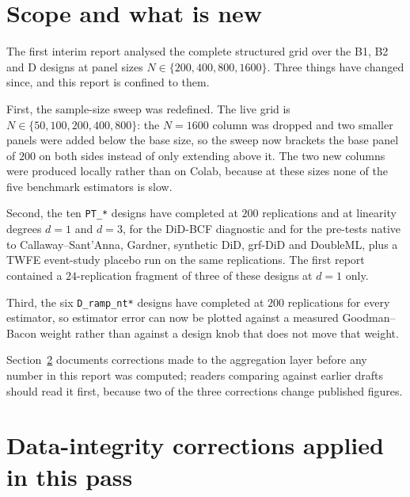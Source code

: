\documentclass[11pt]{article}
\begin{document}
\tableofcontents

\section{Scope and what is new}

The first interim report analysed the complete structured grid over the B1,
B2 and D designs at panel sizes $N\in\{200,400,800,1600\}$. Three things have
changed since, and this report is confined to them.

First, the sample-size sweep was redefined. The live grid is
$N\in\{50,100,200,400,800\}$: the $N=1600$ column was dropped and two smaller
panels were added below the base size, so the sweep now brackets the base
panel of $200$ on both sides instead of only extending above it. The two new
columns were produced locally rather than on Colab, because at these sizes
none of the five benchmark estimators is slow.

Second, the ten \texttt{PT\_*} designs have completed at $200$ replications
and at linearity degrees $d=1$ and $d=3$, for the DiD-BCF diagnostic and for
the pre-tests native to Callaway--Sant'Anna, Gardner, synthetic DiD, grf-DiD
and DoubleML, plus a TWFE event-study placebo run on the same replications.
The first report contained a $24$-replication fragment of three of these
designs at $d=1$ only.

Third, the six \texttt{D\_ramp\_nt*} designs have completed at $200$
replications for every estimator, so estimator error can now be plotted
against a measured Goodman--Bacon weight rather than against a design knob
that does not move that weight.

Section~\ref{sec:integrity} documents corrections made to the aggregation
layer before any number in this report was computed; readers comparing against
earlier drafts should read it first, because two of the three corrections
change published figures.

\section{Data-integrity corrections applied in this pass}
\label{sec:integrity}
\end{document}
